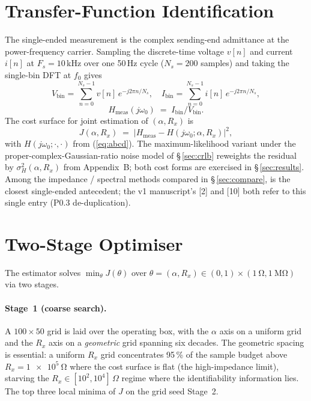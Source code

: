 \documentclass[journal]{IEEEtran}
\begin{document}
\section{Transfer-Function Identification}\label{sec:tf}

The single-ended measurement is the complex sending-end admittance
at the power-frequency carrier.  Sampling the discrete-time
voltage $v[n]$ and current $i[n]$ at $F_s = 10$\,kHz over one
50\,Hz cycle ($N_s = 200$ samples) and taking the single-bin DFT
at $f_0$ gives
\begin{equation}
V_{\mathrm{bin}} = \sum_{n=0}^{N_s-1} v[n] \, e^{-j 2\pi n / N_s},
\quad
I_{\mathrm{bin}} = \sum_{n=0}^{N_s-1} i[n] \, e^{-j 2\pi n / N_s},
\label{eq:bin}
\end{equation}
\begin{equation}
H_{\mathrm{meas}}(j\omega_0) \;=\; I_{\mathrm{bin}} / V_{\mathrm{bin}}.
\label{eq:Hmeas}
\end{equation}
The cost surface for joint estimation of $(\alpha, R_x)$ is
\begin{equation}
J(\alpha, R_x) \;=\;
   \bigl| H_{\mathrm{meas}} - H(j\omega_0;\alpha, R_x) \bigr|^{2},
\label{eq:Jeuclid}
\end{equation}
with $H(j\omega_0;\cdot,\cdot)$ from (\ref{eq:abcd}).  The
maximum-likelihood variant under the proper-complex-Gaussian-ratio
noise model of \S\,\ref{sec:crlb} reweights the residual by
$\sigma_H^2(\alpha, R_x)$ from Appendix~B; both cost forms are
exercised in \S\,\ref{sec:results}.  Among the impedance / spectral
methods compared in \S\,\ref{sec:compare}, \cite{Nunes2019IJEPES}
is the closest single-ended antecedent; the v1 manuscript's [2] and
[10] both refer to this single entry (P0.3 de-duplication).

\section{Two-Stage Optimiser}\label{sec:opt}

The estimator solves $\min_{\theta} J(\theta)$ over
$\theta = (\alpha, R_x) \in (0,1)\times(\SI{1}{\ohm}, \SI{1}{\mega\ohm})$
via two stages.

\paragraph{Stage~1 (coarse search).}
A $100\!\times\!50$ grid is laid over the operating box, with the
$\alpha$ axis on a uniform grid and the $R_x$ axis on a
\emph{geometric} grid spanning six decades.  The geometric spacing
is essential: a uniform $R_x$ grid concentrates 95\,\% of the
sample budget above $R_x = \SI{1e5}{\ohm}$ where the cost surface
is flat (the high-impedance limit), starving the
$R_x \in [10^2, 10^4]\,\Omega$ regime where the
identifiability information lies.  The top three local minima of
$J$ on the grid seed Stage~2.
\end{document}
